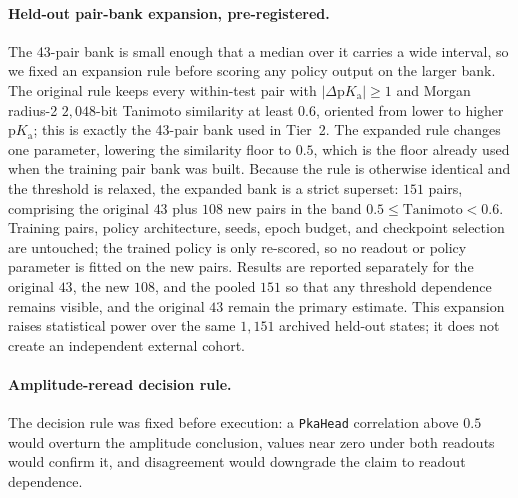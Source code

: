 \documentclass[11pt]{article}
\newcommand{\pka}{\mathrm{p}K_{\mathrm a}}
\begin{document}
\paragraph{Held-out pair-bank expansion, pre-registered.} The 43-pair bank is small enough that a median over it carries a wide interval, so we fixed an expansion rule before scoring any policy output on the larger bank. The original rule keeps every within-test pair with $|\Delta\pka|\geq1$ and Morgan radius-2 $2{,}048$-bit Tanimoto similarity at least $0.6$, oriented from lower to higher $\pka$; this is exactly the 43-pair bank used in Tier~2. The expanded rule changes one parameter, lowering the similarity floor to $0.5$, which is the floor already used when the training pair bank was built. Because the rule is otherwise identical and the threshold is relaxed, the expanded bank is a strict superset: $151$ pairs, comprising the original $43$ plus $108$ new pairs in the band $0.5\leq\mathrm{Tanimoto}<0.6$. Training pairs, policy architecture, seeds, epoch budget, and checkpoint selection are untouched; the trained policy is only re-scored, so no readout or policy parameter is fitted on the new pairs. Results are reported separately for the original $43$, the new $108$, and the pooled $151$ so that any threshold dependence remains visible, and the original $43$ remain the primary estimate. This expansion raises statistical power over the same $1{,}151$ archived held-out states; it does not create an independent external cohort.

\paragraph{Amplitude-reread decision rule.} The decision rule was fixed before execution: a \texttt{PkaHead} correlation above $0.5$ would overturn the amplitude conclusion, values near zero under both readouts would confirm it, and disagreement would downgrade the claim to readout dependence.
\label{sec:amplitude_reread_appendix}
\end{document}
